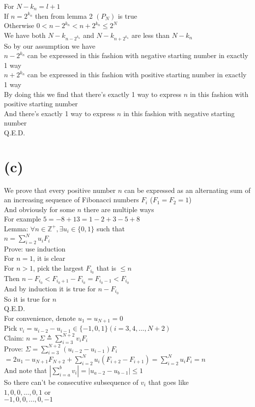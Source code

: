 \documentclass{article}
\begin{document}
For $N-k_n=l+1$\\
If $n=2^{k_n}$ then from lemma 2 $(P_N)$ is true\\
Otherwise $0<n-2^{k_n}<n+2^{k_n}\le 2^N$\\
We have both $N-k_{n-2^{k_n}}$ and $N-k_{n+2^{k_n}}$ are less than $N-k_n$\\
So by our assumption we have\\
$n-2^{k_n}$ can be expressed in this fashion with negative starting number in exactly 1 way\\
$n+2^{k_n}$ can be expressed in this fashion with positive starting number in exactly 1 way\\
By doing this we find that there's exactly 1 way to express $n$ in this fashion with positive starting number\\
And there's exactly 1 way to express $n$ in this fashion with negative starting number\\
Q.E.D.
\section{(c)}
We prove that every positive number $n$ can be expressed as an alternating sum of an increasing sequence of Fibonacci numbers $F_i$ ($F_1=F_2=1$)\\
And obviously for some $n$ there are multiple ways\\
For example $5=-8+13=1-2+3-5+8$\\[22pt]
Lemma: $\forall n\in \mathbb{Z}^+,\exists u_i\in \{0,1\}$ such that\\
$n=\sum\limits_{i=2}^N u_i F_i$\\
Prove: use induction\\
For $n=1$, it is clear\\
For $n>1$, pick the largest $F_{i_0}$ that is $\le n$\\
Then $n-F_{i_0}<F_{i_0+1}-F_{i_0}=F_{i_0-1}<F_{i_0}$\\
And by induction it is true for $n-F_{i_0}$\\
So it is true for $n$\\
Q.E.D.\\
For convenience, denote $u_1=u_{N+1}=0$\\
Pick $v_i=u_{i-2}-u_{i-1}\in \{-1,0,1\}(i=3,4,...,N+2)$\\
Claim: $n=\Sigma\triangleq\sum\limits_{i=3}^{N+2} v_i F_i$\\
Prove: $\Sigma=\sum\limits_{i=3}^{N+2}(u_{i-2}-u_{i-1})F_i$\\
$=2u_1-u_{N+1}F_{N+2}+\sum\limits_{i=2}^N u_i(F_{i+2}-F_{i+1})=\sum\limits_{i=2}^N u_i F_i=n$\\
And note that $|\sum\limits_{i=a}^b v_i|=|u_{a-2}-u_{b-1}|\le 1$\\
So there can't be consecutive subsequence of $v_i$ that goes like\\
$1,0,0,...,0,1$ or\\
$-1,0,0,...,0,-1$
\end{document}
